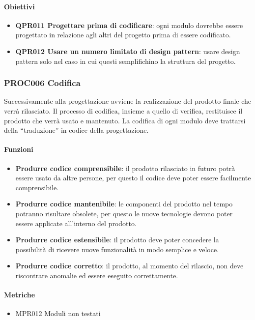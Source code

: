         \paragraph*{Obiettivi}
        \begin{itemize}
            \item \textbf{QPR011 Progettare prima di codificare}: ogni modulo dovrebbe essere progettato in relazione agli altri del progetto prima di essere codificato.
            \item \textbf{QPR012 Usare un numero limitato di design pattern}: usare design pattern solo nel caso in cui questi semplifichino la struttura del progetto.
        \end{itemize}

    \subsubsection{PROC006 Codifica}\label{proc006}
    Successivamente alla progettazione avviene la realizzazione del prodotto finale che verrà rilasciato. Il processo di codifica, insieme a quello di verifica, restituisce il prodotto che verrà usato e mantenuto. La codifica di ogni modulo deve trattarsi della ``traduzione'' in codice della progettazione.

        \paragraph*{Funzioni}
        \begin{itemize}
            \item \textbf{Produrre codice comprensibile}: il prodotto rilasciato in futuro potrà essere usato da altre persone, per questo il codice deve poter essere facilmente comprensibile.
            \item \textbf{Produrre codice mantenibile}: le componenti del prodotto nel tempo potranno risultare obsolete, per questo le nuove tecnologie devono poter essere applicate all'interno del prodotto.
            \item \textbf{Produrre codice estensibile}: il prodotto deve poter concedere la possibilità di ricevere nuove funzionalità in modo semplice e veloce.
            \item \textbf{Produrre codice corretto}: il prodotto, al momento del rilascio, non deve riscontrare anomalie ed essere eseguito correttamente.
        \end{itemize}

        \paragraph*{Metriche}
        \begin{itemize}
            \item MPR012 Moduli non testati
        \end{itemize}

